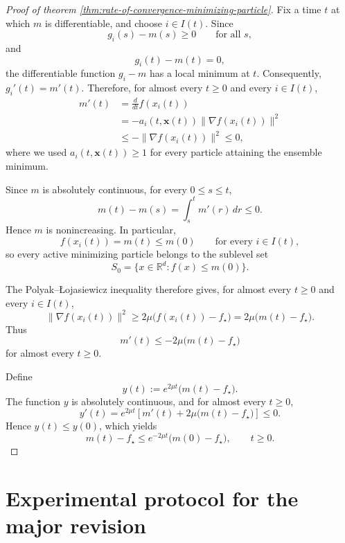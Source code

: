 \documentclass{article}
\theoremstyle{plain}
\theoremstyle{definition}
\theoremstyle{remark}
\begin{document}
\begin{proof}[Proof of theorem \ref{thm:rate-of-convergence-minimizing-particle}]
Fix a time \(t\) at which \(m\) is differentiable, and choose \(i\in I(t)\). Since
\[
    g_i(s)-m(s)\ge0 \qquad\text{for all }s,
\]
and
\[
    g_i(t)-m(t)=0,
\]
the differentiable function \(g_i-m\) has a local minimum at \(t\). Consequently, \( g_i'(t)=m'(t). \)
Therefore, for almost every \(t\ge0\) and every \(i\in I(t)\),
\[
\begin{aligned}
    m'(t) &= \frac{d}{dt}f(x_i(t)) \\ 
    &= -a_i(t,\mathbf x(t)) \|\nabla f(x_i(t))\|^2 \\
    &\le -\|\nabla f(x_i(t))\|^2 \le0,
\end{aligned}
\]
where we used \(a_i(t,\mathbf x(t))\ge1\) for every particle attaining the ensemble minimum.

Since \(m\) is absolutely continuous, for every \(0\le s\le t\),
\[
    m(t)-m(s) = \int_s^t m'(r)\,dr \le0.
\]
Hence \(m\) is nonincreasing. In particular,
\[
    f(x_i(t))=m(t)\le m(0) \qquad \text{for every }i\in I(t),
\]
so every active minimizing particle belongs to the sublevel set
\[
    S_0=\{x\in\mathbb R^d:f(x)\le m(0)\}.
\]

The Polyak--\L{}ojasiewicz inequality therefore gives, for almost every \(t\ge0\) and every \(i\in I(t)\),
\[
    \|\nabla f(x_i(t))\|^2 \ge 2\mu\bigl(f(x_i(t))-f_\star\bigr) = 2\mu\bigl(m(t)-f_\star\bigr).
\]
Thus
\[
    m'(t) \le -2\mu\bigl(m(t)-f_\star\bigr)
\]
for almost every \(t\ge0\).

Define
\[
    y(t):=e^{2\mu t}\bigl(m(t)-f_\star\bigr).
\]
The function \(y\) is absolutely continuous, and for almost every \(t\ge0\),
\[
    y'(t)= e^{2\mu t} \left[ m'(t)+2\mu\bigl(m(t)-f_\star\bigr) \right] \le0.
\]
Hence \(y(t)\le y(0)\), which yields
\[
    m(t)-f_\star \le e^{-2\mu t}\bigl(m(0)-f_\star\bigr), \qquad t\ge0.
\]
\end{proof}

\section{Experimental protocol for the major revision}
\label{app:hyperparameters}
\end{document}
